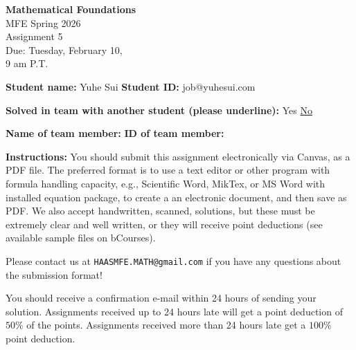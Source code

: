 \documentclass{article}
\begin{document}
\begin{center}
\textbf{Mathematical Foundations} \\
MFE Spring 2026 \\
Assignment 5 \\
Due: Tuesday, February 10, \\
9 am P.T.
\end{center}

\vspace{1em}

\noindent \textbf{Student name:} Yuhe Sui \hspace{3.54cm} \textbf{Student ID:} job@yuhesui.com

\vspace{1em}

\noindent \textbf{Solved in team with another student (please underline):} \hspace{1cm} Yes \hspace{1cm} \underline{No}

\vspace{1em}

\noindent \textbf{Name of team member:} \hspace{3cm} \textbf{ID of team member:}

\vspace{1em}

\noindent \textbf{Instructions:} You should submit this assignment electronically via Canvas, as a PDF file. The preferred format is to use a text editor or other program with formula handling capacity, e.g., Scientific Word, MikTex, or MS Word with installed equation package, to create a an electronic document, and then save as PDF. We also accept handwritten, scanned, solutions, but these must be extremely clear and well written, or they will receive point deductions (see available sample files on bCourses).

\vspace{1em}

\noindent Please contact us at \texttt{HAASMFE.MATH@gmail.com} if you have any questions about the submission format!

\vspace{1em}

\noindent You should receive a confirmation e-mail within 24 hours of sending your solution. Assignments received up to 24 hours late will get a point deduction of $50\%$ of the points. Assignments received more than 24 hours late get a $100\%$ point deduction.

\vspace{1em}
\end{document}
